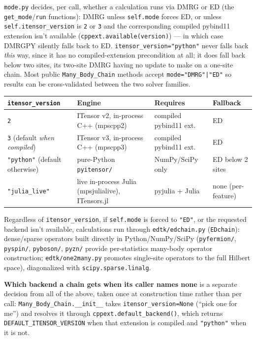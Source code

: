 \documentclass[11pt]{article}
\begin{document}
\texttt{mode.py} decides, per call, whether a calculation runs via DMRG
or ED (the \texttt{get\_mode}/\texttt{run} functions): DMRG unless
\texttt{self.mode} forces ED, or unless \texttt{self.itensor\_version} is
\texttt{2} or \texttt{3} and the corresponding compiled pybind11
extension isn't available (\texttt{cppext.available(version)}) --- in
which case DMRGPY silently falls back to ED.
\texttt{itensor\_version="python"} never falls back \emph{this} way,
since it has no compiled-extension precondition at all; it does fall back
below two sites, its two-site DMRG having no update to make on a one-site
chain. Most public
\texttt{Many\_Body\_Chain} methods accept \texttt{mode="DMRG"|"ED"} so
results can be cross-validated between the two solver families.

\begin{center}
\begin{tabular}{@{}p{}p{}p{}p{}@{}}
\toprule
\texttt{itensor\_version} & Engine & Requires & Fallback \\
\midrule
\texttt{2} & ITensor v2, in-process C++ (mpscpp2) & compiled pybind11 ext. & ED \\
\texttt{3} (default \emph{when compiled}) & ITensor v3, in-process C++ (mpscpp3) & compiled pybind11 ext. & ED \\
\texttt{"python"} (default otherwise) & pure-Python \texttt{pyitensor/} & NumPy/SciPy only & ED below 2 sites \\
\texttt{"julia\_live"} & live in-process Julia (mpsjulialive), ITensors.jl & pyjulia + Julia & none (per-feature) \\
\bottomrule
\end{tabular}
\end{center}

Regardless of \texttt{itensor\_version}, if \texttt{self.mode} is forced
to \texttt{"ED"}, or the requested backend isn't available, calculations
run through \texttt{edtk/edchain.py} (\texttt{EDchain}): dense/sparse
operators built directly in Python/NumPy/SciPy (\texttt{pyfermion/},
\texttt{pyspin/}, \texttt{pyboson/}, \texttt{pyzn/} provide per-statistics
many-body operator construction; \texttt{edtk/one2many.py} promotes
single-site operators to the full Hilbert space), diagonalized with
\texttt{scipy.sparse.linalg}.

\textbf{Which backend a chain gets when its caller names none} is a
separate decision from all of the above, taken once at construction time
rather than per call: \texttt{Many\_Body\_Chain.\_\_init\_\_} takes
\texttt{itensor\_version=None} (``pick one for me'') and resolves it
through \texttt{cppext.default\_backend()}, which returns
\texttt{DEFAULT\_ITENSOR\_VERSION} when that extension is compiled and
\texttt{"python"} when it is not.
\end{document}
